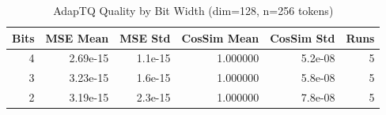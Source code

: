 
\begin{table}[h]
\centering
\caption{AdapTQ Quality by Bit Width (dim=128, n=256 tokens)}
\begin{tabular}{rrrrrr}
\hline
Bits & MSE Mean & MSE Std & CosSim Mean & CosSim Std & Runs \\
\hline
  4 & 2.69e-15 & 1.1e-15 & 1.000000 & 5.2e-08 & 5 \\
  3 & 3.23e-15 & 1.6e-15 & 1.000000 & 5.8e-08 & 5 \\
  2 & 3.19e-15 & 2.3e-15 & 1.000000 & 7.8e-08 & 5 \\
\hline
\end{tabular}
\end{table}
